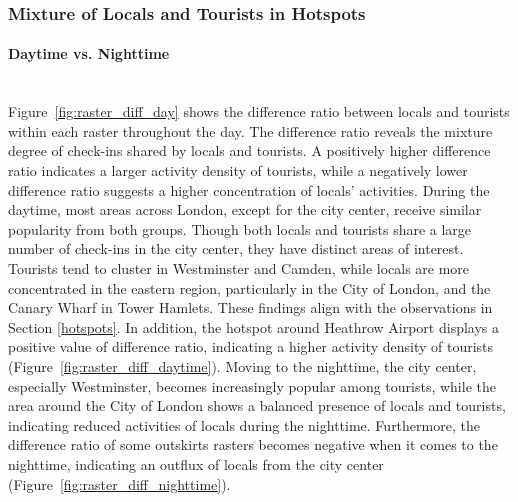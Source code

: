 \documentclass{article}
\newcommand{\subsubsubsection}[1]{\paragraph{#1}\mbox{}\\}
\theoremstyle{remark}
\begin{document}
\subsubsection{Mixture of Locals and Tourists in Hotspots}

\subsubsubsection{Daytime vs. Nighttime}
Figure~\ref{fig:raster_diff_day} shows the difference ratio between locals and tourists within each raster throughout the day. The difference ratio reveals the mixture degree of check-ins shared by locals and tourists. A positively higher difference ratio indicates a larger activity density of tourists, while a negatively lower difference ratio suggests a higher concentration of locals' activities. During the daytime, most areas across London, except for the city center, receive similar popularity from both groups. Though both locals and tourists share a large number of check-ins in the city center, they have distinct areas of interest. Tourists tend to cluster in Westminster and Camden, while locals are more concentrated in the eastern region, particularly in the City of London, and the Canary Wharf in Tower Hamlets. These findings align with the observations in Section \ref{hotspots}. In addition, the hotspot around Heathrow Airport displays a positive value of difference ratio, indicating a higher activity density of tourists (Figure~\ref{fig:raster_diff_daytime}). Moving to the nighttime, the city center, especially Westminster, becomes increasingly popular among tourists, while the area around the City of London shows a balanced presence of locals and tourists, indicating reduced activities of locals during the nighttime. Furthermore, the difference ratio of some outskirts rasters becomes negative when it comes to the nighttime, indicating an outflux of locals from the city center (Figure~\ref{fig:raster_diff_nighttime}).
\end{document}
